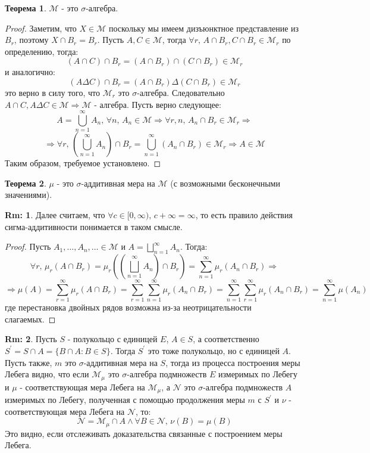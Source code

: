 \documentclass[12pt]{article}
\newcommand{\MM}{\mathcal{M}}
\newcommand{\MCN}{\mathcal{N}}
\theoremstyle{definition}
\newtheorem{rem}{Rm:}
\newtheorem{theorem}{Теорема}
\begin{document}
\begin{theorem}
	$\MM$ - это $\sigma$-алгебра.
\end{theorem}
\begin{proof}
	Заметим, что $X \in \MM$ поскольку мы имеем дизъюнктное представление из $B_r$, поэтому $X \cap B_r = B_r$. Пусть $A, C \in \MM$, тогда $\forall r, \, A \cap B_r, C \cap B_r \in \MM_r$ по определению, тогда:
	$$
		(A\cap C)\cap B_r = (A\cap B_r)\cap (C \cap B_r) \in \MM_r
	$$
	и аналогично:
	$$
		(A\Delta C) \cap B_r = (A \cap B_r) \Delta (C \cap B_r) \in \MM_r
	$$
	это верно в силу того, что $\MM_r$ это $\sigma$-алгебра. Следовательно $A \cap C, A \Delta C \in \MM \Rightarrow \MM$ - алгебра. Пусть верно следующее:
	$$
		A = \bigcup\limits_{n = 1}^{\infty}A_n, \, \forall n, \, A_n \in \MM \Rightarrow \forall r,n, \, A_n \cap B_r \in \MM_r \Rightarrow 
	$$
	$$	
		\Rightarrow \forall r, \, \left(\bigcup\limits_{n = 1}^{\infty}A_n\right)\cap B_r = \bigcup\limits_{n = 1}^{\infty}(A_n \cap B_r) \in \MM_r \Rightarrow A \in \MM
	$$
	Таким образом, требуемое установлено.
\end{proof}
\begin{theorem}
	$\mu$ - это $\sigma$-аддитивная мера на $\MM$ (с возможными бесконечными значениями).
\end{theorem}
\begin{rem}
	Далее считаем, что $\forall c \in [0,\infty), \, c + \infty = \infty$, то есть правило действия сигма-аддитивности понимается в таком смысле.
\end{rem}
\begin{proof}
	Пусть $A_1, \dotsc, A_n, \dotsc \in \MM$ и $A = \bigsqcup\limits_{n = 1}^{\infty}A_n$. Тогда: 
	$$
		\forall r, \, \mu_r(A \cap B_r) = \mu_r\left(\left(\bigsqcup\limits_{n = 1}^{\infty}A_n\right) \cap B_r \right) = \sum\limits_{n = 1}^{\infty}\mu_r(A_n \cap B_r) \Rightarrow 
	$$
	$$
		\Rightarrow \mu(A) = \sum\limits_{r = 1}^{\infty}\mu_r(A \cap B_r) = \sum\limits_{r = 1}^{\infty}\sum\limits_{n = 1}^{\infty}\mu_r(A_n \cap B_r) = \sum\limits_{n = 1}^{\infty}\sum\limits_{r = 1}^{\infty}\mu_r(A_n \cap B_r) = \sum\limits_{n = 1}^{\infty} \mu(A_n)
	$$
	где перестановка двойных рядов возможна из-за неотрицательности слагаемых.
\end{proof}
\begin{rem}
	Пусть $S$ - полукольцо с единицей $E$, $A \in S$, а соответственно $S^\prime = S \cap A = \{B \cap A \colon B \in S\}$. Тогда $S^\prime$ это тоже полукольцо, но с единицей $A$. Пусть также, $m$ это $\sigma$-аддитивная мера на $S$, тогда из процесса построения меры Лебега видно, что если $\MM_\mu$ это $\sigma$-алгебра подмножеств $E$ измеримых по Лебегу и $\mu$ - соответствующая мера Лебега на $\MM_\mu$, а $\MCN$ это $\sigma$-алгебра подмножеств $A$ измеримых по Лебегу, полученная с помощью продолжения меры $m$ с $S^\prime$ и $\nu$ - соответствующая мера Лебега на $\MCN$, то:
	$$
		\MCN = \MM_\mu \cap A \wedge \forall B \in \MCN,\, \nu(B) = \mu(B)
	$$
	Это видно, если отслеживать доказательства связанные с построением меры Лебега.
\end{rem}
\end{document}

